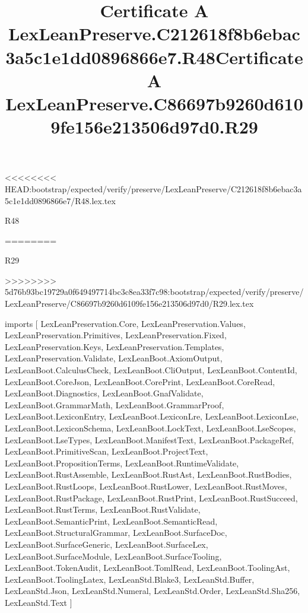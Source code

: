 <<<<<<<< HEAD:bootstrap/expected/verify/preserve/LexLeanPreserve/C212618f8b6ebac3a5c1e1dd0896866e7/R48.lex.tex
\begin{lexlean}{R48}
\title{Certificate A LexLeanPreserve.C212618f8b6ebac3a5c1e1dd0896866e7.R48}
========
\begin{lexlean}{R29}
\title{Certificate A LexLeanPreserve.C86697b9260d6109fe156e213506d97d0.R29}
>>>>>>>> 5d76b93bc19729a0f649497714bc3c8ea33f7c98:bootstrap/expected/verify/preserve/LexLeanPreserve/C86697b9260d6109fe156e213506d97d0/R29.lex.tex
\begin{coremodule}
imports [
  LexLeanPreservation.Core,
  LexLeanPreservation.Values,
  LexLeanPreservation.Primitives,
  LexLeanPreservation.Fixed,
  LexLeanPreservation.Keys,
  LexLeanPreservation.Templates,
  LexLeanPreservation.Validate,
  LexLeanBoot.AxiomOutput,
  LexLeanBoot.CalculusCheck,
  LexLeanBoot.CliOutput,
  LexLeanBoot.ContentId,
  LexLeanBoot.CoreJson,
  LexLeanBoot.CorePrint,
  LexLeanBoot.CoreRead,
  LexLeanBoot.Diagnostics,
  LexLeanBoot.GnafValidate,
  LexLeanBoot.GrammarMath,
  LexLeanBoot.GrammarProof,
  LexLeanBoot.LexiconEntry,
  LexLeanBoot.LexiconLre,
  LexLeanBoot.LexiconLse,
  LexLeanBoot.LexiconSchema,
  LexLeanBoot.LockText,
  LexLeanBoot.LseScopes,
  LexLeanBoot.LseTypes,
  LexLeanBoot.ManifestText,
  LexLeanBoot.PackageRef,
  LexLeanBoot.PrimitiveScan,
  LexLeanBoot.ProjectText,
  LexLeanBoot.PropositionTerms,
  LexLeanBoot.RuntimeValidate,
  LexLeanBoot.RustAssemble,
  LexLeanBoot.RustAst,
  LexLeanBoot.RustBodies,
  LexLeanBoot.RustLoops,
  LexLeanBoot.RustLower,
  LexLeanBoot.RustMoves,
  LexLeanBoot.RustPackage,
  LexLeanBoot.RustPrint,
  LexLeanBoot.RustSucceed,
  LexLeanBoot.RustTerms,
  LexLeanBoot.RustValidate,
  LexLeanBoot.SemanticPrint,
  LexLeanBoot.SemanticRead,
  LexLeanBoot.StructuralGrammar,
  LexLeanBoot.SurfaceDoc,
  LexLeanBoot.SurfaceGeneric,
  LexLeanBoot.SurfaceLex,
  LexLeanBoot.SurfaceModule,
  LexLeanBoot.SurfaceTooling,
  LexLeanBoot.TokenAudit,
  LexLeanBoot.TomlRead,
  LexLeanBoot.ToolingAst,
  LexLeanBoot.ToolingLatex,
  LexLeanStd.Blake3,
  LexLeanStd.Buffer,
  LexLeanStd.Json,
  LexLeanStd.Numeral,
  LexLeanStd.Order,
  LexLeanStd.Sha256,
  LexLeanStd.Text
]


\end{coremodule}
\end{lexlean}
\end{lexlean}
